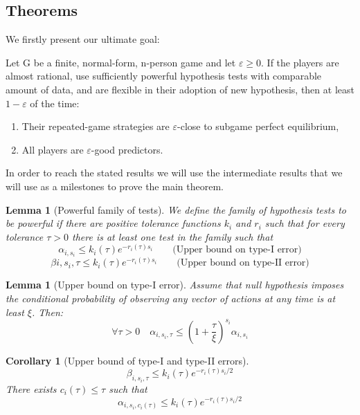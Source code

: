 \documentclass[]{spie}  %
\newtheorem{corollary}{Corollary}[theorem]
\newtheorem{lemma}[theorem]{Lemma}
\begin{document}
\subsection{Theorems}
\label{sec:th}

We firstly present our ultimate goal:

\begin{theo}
\label{maintheorem}
Let G be a finite, normal-form, n-person game and let $\varepsilon \geq 0$. If the players are almost rational, use sufficiently powerful hypothesis tests with comparable amount of data, and are flexible in their adoption of new hypothesis, then at least $1-\varepsilon$ of the time:
\begin{enumerate}[I]
    \item Their repeated-game strategies are $\varepsilon$-close to subgame perfect equilibrium,
    \item All players are $\varepsilon$-good predictors.
\end{enumerate}
\end{theo}

In order to reach the stated results we will use the intermediate results that we will use as a milestones to prove the main theorem.

\begin{lemma}[Powerful family of tests]
\label{powerful}
We define the family of hypothesis tests to be powerful if there are positive tolerance functions $k_i$ and $r_i$ such that for every tolerance $\tau > 0$ there is at least one test in the family such that
$$ \alpha_{i,s_i} \leq k_i(\tau) e^{-r_i(\tau)s_i} \quad \quad \text{(Upper bound on type-I error)}$$
$$ \beta{i,s_i, \tau} \leq k_i(\tau) e^{-r_i(\tau)s_i} \quad \quad \text{(Upper bound on type-II error)}$$
\end{lemma}

\begin{lemma}[Upper bound on type-I error]
\label{upperbounds}
Assume that null hypothesis imposes the conditional probability of observing any vector of actions at any time is at least $\xi$. Then: $$\forall \tau > 0 \quad \alpha_{i,s_i,\tau} \leq (1 + \frac{\tau}{\xi})^{s_i}\alpha_{i,s_i}$$
\end{lemma}

\begin{corollary}[Upper bound of type-I and type-II errors]
$$ \beta_{i,s_i,\tau} \leq k_i(\tau) e^{-r_i(\tau) s_i/2} $$
There exists $c_i(\tau) \leq \tau$ such that
$$ \alpha_{i,s_i,c_i(\tau)}  \leq k_i(\tau) e^{-r_i(\tau) s_i/2} $$
\end{corollary}
\end{document}
